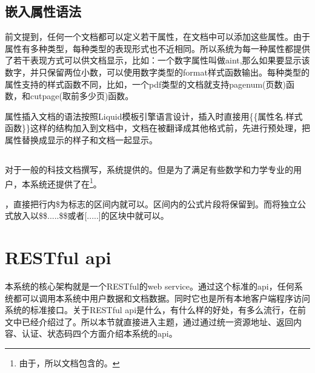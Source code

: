 \subsection{嵌入属性语法}
\label{sec:addattr}

前文提到，任何一个文档都可以定义若干属性，在文档中可以添加这些属性。由于属性有多种类型，每种类型的表现形式也不近相同。所以系统为每一种属性都提供了若干表现方式可以供文档显示，比如：一个数字属性叫做aint,那么如果要显示该数字，并只保留两位小数，可以使用数字类型的format样式函数输出。每种类型的属性支持的样式函数不同，比如，一个pdf类型的文档就支持pagenum(页数)函数，和cutpage(取前多少页)函数。

属性插入文档的语法按照Liquid模板引擎语言设计，插入时直接用\{\{属性名.样式函数\}\}这样的结构加入到文档中，文档在被翻译成其他格式前，先进行预处理，把属性替换成显示的样子和文档一起显示。

\subsection{}
\label{sec:latexpic}

对于一般的科技文档撰写，系统提供的。但是为了满足有些数学和力学专业的用户，本系统还提供了在\footnote{由于，所以文档包含的。}。

，直接把行内\$为标志的区间内就可以。区间内的公式片段将保留到。而将独立公式放入以\$\$.....\$\$或者[.....]的区块中就可以。

\section{RESTful api}
\label{sec:apitable}

本系统的核心架构就是一个RESTful的web service。通过这个标准的api，任何系统都可以调用本系统中用户数据和文档数据。同时它也是所有本地客户端程序访问系统的标准接口。关于RESTful api是什么，有什么样的好处，有多么流行，在前文中已经介绍过了。所以本节就直接进入主题，通过通过统一资源地址、返回内容、认证、状态码四个方面介绍本系统的api。
